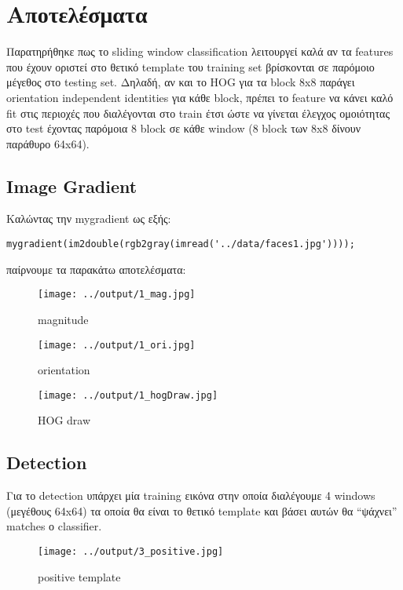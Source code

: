 \documentclass[11pt]{scrartcl} %
\begin{document}
\section{Αποτελέσματα}
Παρατηρήθηκε πως το sliding window classification λειτουργεί καλά αν τα features που έχουν οριστεί
στο θετικό template του training set βρίσκονται σε παρόμοιο μέγεθος στο testing set. Δηλαδή, αν
και το HOG για τα block 8x8 παράγει orientation independent identities για κάθε block, πρέπει το
feature να κάνει καλό fit στις περιοχές που διαλέγονται στο train έτσι ώστε να γίνεται έλεγχος
ομοιότητας στο test έχοντας παρόμοια 8 block σε κάθε window (8 block των 8x8 δίνουν παράθυρο 64x64).

\subsection{Image Gradient}

Καλώντας την mygradient ως εξής:

\begin{verbatim}
mygradient(im2double(rgb2gray(imread('../data/faces1.jpg'))));
\end{verbatim}

παίρνουμε τα παρακάτω αποτελέσματα:

\begin{figure}[H]
  \texttt{[image: ../output/1\_mag.jpg]}
  \caption{magnitude}
\end{figure}

\begin{figure}[H]
  \texttt{[image: ../output/1\_ori.jpg]}
  \caption{orientation}
\end{figure}

\begin{figure}[H]
  \texttt{[image: ../output/1\_hogDraw.jpg]}
  \caption{HOG draw}
\end{figure}

\subsection{Detection}
Για το detection υπάρχει μία training εικόνα στην οποία διαλέγουμε 4 windows (μεγέθους
64x64) τα οποία θα είναι το θετικό template και βάσει αυτών θα ``ψάχνει'' matches
ο classifier.

\begin{figure}[H]
  \texttt{[image: ../output/3\_positive.jpg]}
  \caption{positive template}
\end{figure}
\end{document}
